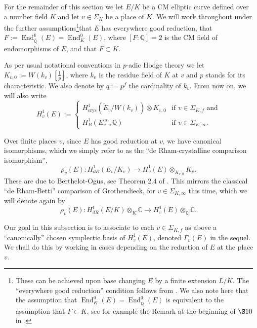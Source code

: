 \documentclass[12pt,twoside,a4paper]{article}
\theoremstyle{plain}%
\DeclareMathOperator{\End}{End}
\DeclareMathOperator{\crys}{crys}
\newcommand{\C}{\mathbb{C}}
\newcommand{\Q}{\mathbb{Q}}
\begin{document}
For the remainder of this section we let  $E/K$ be a CM elliptic curve defined over a number field $K$ and let $v\in \Sigma_{K}$ be a place of $K$. We will work throughout under the further assumptions\footnote{These can be achieved upon base changing $E$ by a finite extension $L/K$. The ``everywhere good reduction'' condition follows from \cite{serretate}. We also note here that the assumption that $\End^{0}_K(E)=\End^0_{\bar{\Q}}(E)$ is equivalent to the assumption that $F\subset K$, see for example the Remark at the beginning of $\S 10$ in \cite{langellfuns}.}that $E$ has everywhere good reduction, that $F:=\End_{\bar{\Q}}^{0}(E)=\End_{K}^{0}(E)$, where $[F:\Q]=2$ is the CM field of endomorphisms of $E$, and that $F\subset K$. 

As per usual notational conventions in $p$-adic Hodge theory we let $K_{v,0}:=W(k_v)[\frac{1}{p}]$, where $k_v$ is the residue field of $K$ at $v$ and $p$ stands for its characteristic. We also denote by $q:=p^f$ the cardinality of $k_v$. From now on, we will also write \begin{equation}
		H^1_v(E):= \begin{cases}H^1_{\crys}(\tilde{E}_v/W(k_v))\otimes K_{v,0}& \text{if }v\in\Sigma_{K,f} \text{ and} \\
H^1_{B}(E_v^{an},\Q)& \text{if } v\in\Sigma_{K,\infty}. 
		\end{cases}
\end{equation}

Over finite places $v$, since $E$ has good reduction at $v$, we have canonical isomorphisms, which we simply refer to as the ``de Rham-crystalline comparison isomorphism'',
\begin{equation}\label{eq:canoniso}
	\rho_v(E):H^1_{dR}(E_v/K_v)\rightarrow H^1_v(E)\otimes_{K_{v,0}} K_v.
\end{equation}These are due to Berthelot-Ogus, see Theorem $2.4$ of \cite{bertogus}. This mirrors the classical ``de Rham-Betti'' comparison of Grothendieck, for $v\in\Sigma_{K,\infty}$ this time, which we will denote again by 
\begin{equation}\label{eq:canonisobetti}
\rho_v(E):H^1_{dR}(E/K)\otimes_K \C \rightarrow H^1_v(E)\otimes_{\Q} \C.
\end{equation}

	Our goal in this subsection is to associate to each $v\in\Sigma_{K,f}$ as above a ``canonically'' chosen symplectic basis of $H^1_v(E)$, denoted $\Gamma_v(E)$ in the sequel. We shall do this by working in cases depending on the reduction of $E$ at the place $v$.
	
\end{document}
